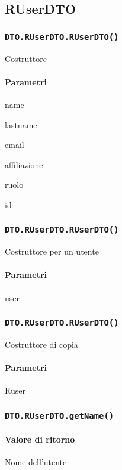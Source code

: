\subsection{RUserDTO}
\subsubsection{\texttt{DTO.RUserDTO.RUserDTO()}}
Costruttore
\paragraph{Parametri}
\begin{description}
\item name
\item lastname
\item email
\item affiliazione
\item ruolo
\item id
\end{description}
\subsubsection{\texttt{DTO.RUserDTO.RUserDTO()}}
Costruttore per un utente
\paragraph{Parametri}
\begin{description}
\item user
\end{description}
\subsubsection{\texttt{DTO.RUserDTO.RUserDTO()}}
Costruttore di copia
\paragraph{Parametri}
\begin{description}
\item Ruser
\end{description}
\subsubsection{\texttt{DTO.RUserDTO.getName()}}
\paragraph{Valore di ritorno}
\begin{description}
\item Nome dell'utente
\end{description}
